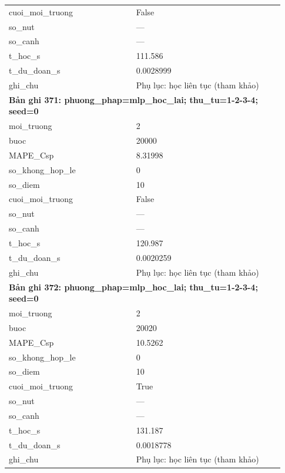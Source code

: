 \begin{longtable}{p{0.43\linewidth}p{0.50\linewidth}}
cuoi\_\allowbreak moi\_\allowbreak truong & False \\
so\_\allowbreak nut & — \\
so\_\allowbreak canh & — \\
t\_\allowbreak hoc\_\allowbreak s & 111.586 \\
t\_\allowbreak du\_\allowbreak doan\_\allowbreak s & 0.0028999 \\
ghi\_\allowbreak chu & Phụ lục: học liên tục (tham khảo) \\
\midrule
\multicolumn{2}{p{0.95\linewidth}}{\textbf{Bản ghi 371: phuong\_phap=mlp\_hoc\_lai; thu\_tu=1-2-3-4; seed=0}} \\
moi\_\allowbreak truong & 2 \\
buoc & 20000 \\
MAPE\_\allowbreak Csp & 8.31998 \\
so\_\allowbreak khong\_\allowbreak hop\_\allowbreak le & 0 \\
so\_\allowbreak diem & 10 \\
cuoi\_\allowbreak moi\_\allowbreak truong & False \\
so\_\allowbreak nut & — \\
so\_\allowbreak canh & — \\
t\_\allowbreak hoc\_\allowbreak s & 120.987 \\
t\_\allowbreak du\_\allowbreak doan\_\allowbreak s & 0.0020259 \\
ghi\_\allowbreak chu & Phụ lục: học liên tục (tham khảo) \\
\midrule
\multicolumn{2}{p{0.95\linewidth}}{\textbf{Bản ghi 372: phuong\_phap=mlp\_hoc\_lai; thu\_tu=1-2-3-4; seed=0}} \\
moi\_\allowbreak truong & 2 \\
buoc & 20020 \\
MAPE\_\allowbreak Csp & 10.5262 \\
so\_\allowbreak khong\_\allowbreak hop\_\allowbreak le & 0 \\
so\_\allowbreak diem & 10 \\
cuoi\_\allowbreak moi\_\allowbreak truong & True \\
so\_\allowbreak nut & — \\
so\_\allowbreak canh & — \\
t\_\allowbreak hoc\_\allowbreak s & 131.187 \\
t\_\allowbreak du\_\allowbreak doan\_\allowbreak s & 0.0018778 \\
ghi\_\allowbreak chu & Phụ lục: học liên tục (tham khảo) \\

\end{longtable}
